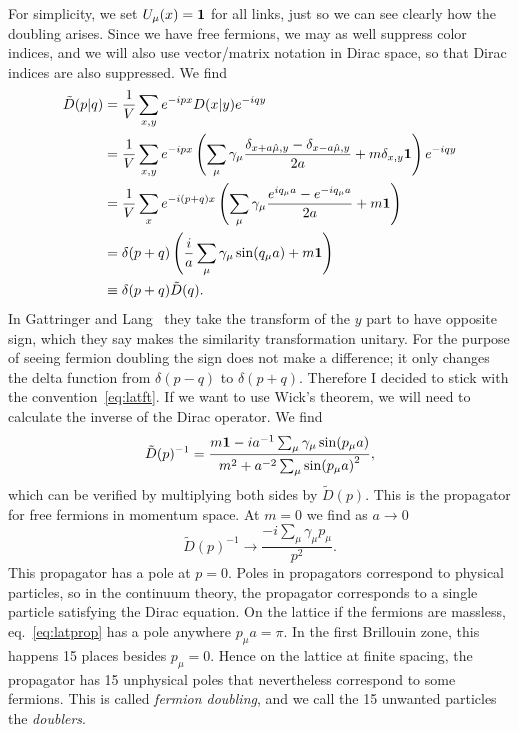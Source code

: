 For simplicity, we set $U_\mu(x)={\mathbf 1}$
for all links, just so we can see clearly how the doubling arises.
Since we have free fermions, we may as well suppress color indices,
and we will also use vector/matrix notation in Dirac space, so that
Dirac indices are also suppressed. We find
\begin{equation}\begin{aligned}
  \tilde{D}(p|q)&=\frac{1}{V}\sum_{x,y}e^{-ipx}D(x|y)e^{-iqy}\\
     &=\frac{1}{V}\sum_{x,y}e^{-ipx}\left(
      \sum_\mu\gamma_\mu\frac{\delta_{x+a\hat{\mu},y}
                             -\delta_{x-a\hat{\mu},y}}{2a}+m\delta_{x,y}{\mathbf 1}
      \right)e^{-iqy}\\
     &=\frac{1}{V}\sum_xe^{-i(p+q)x}\left(
      \sum_\mu\gamma_\mu\frac{e^{iq_\mu a}-e^{-iq_\mu a}}{2a}+m{\mathbf 1}\right)\\
     &=\delta(p+q)\left(\frac{i}{a}\sum_\mu
                    \gamma_\mu\sin(q_\mu a)+m{\mathbf 1}\right)\\
     &\equiv\delta(p+q)\tilde{D}(q).
\end{aligned}\end{equation}
In Gattringer and Lang~\cite{gattringer_quantum_2010} they take the transform
of the $y$ part to have opposite sign, which they say makes the similarity
transformation unitary. For the purpose of seeing fermion doubling
the sign does not make a difference; it only changes the delta
function from $\delta(p-q)$ to $\delta(p+q)$. Therefore I decided to stick
with the convention~\eqref{eq:latft}. If we want to use Wick's theorem,
we will need to calculate the inverse of the Dirac operator. We find
\begin{equation}\label{eq:latprop}
  \tilde{D}(p)^{-1}=\frac{m{\mathbf 1}-ia^{-1}\sum_\mu\gamma_\mu\sin(p_\mu a)}
                         {m^2+a^{-2}\sum_\mu\sin(p_\mu a)^2},
\end{equation}
which can be verified by multiplying both sides by $\tilde{D}(p)$. This
is the propagator for free fermions in momentum space. At $m=0$ we find
as $a\to0$
\begin{equation}
  \tilde{D}(p)^{-1}\to\frac{-i\sum_\mu\gamma_\mu p_\mu}{p^2}.
\end{equation}
This propagator has a pole at $p=0$. Poles in propagators correspond
to physical particles, so in the continuum theory, the propagator
corresponds to a single particle satisfying the Dirac equation. On
the lattice if the fermions are massless, eq.~\eqref{eq:latprop} has
a pole anywhere $p_\mu a=\pi$. In the first Brillouin zone, this
happens 15 places besides $p_\mu=0$. Hence on the lattice at finite
spacing, the propagator has 15 unphysical poles that nevertheless
correspond to some fermions. This is called {\it fermion doubling},
and we call the 15 unwanted particles the {\it doublers}.

